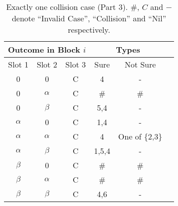 \documentclass[fleqn]{article}
\begin{document}
\begin {table} 
\centering
\begin{tabular}{|c|c|c|c|c|c|} 
\hline
\multicolumn{3}{|c|}{Outcome in Block $i$} & \multicolumn{2}{c|}{Types} \\ \hline
Slot 1        & Slot 2        & Slot 3     & Sure    & Not Sure         \\ \hline
0             & 0             & C          & 4       & -                \\ \hline
0             & $\alpha$      & C          & \#      & \#               \\ \hline
0             & $\beta$       & C          & 5,4     & -                \\ \hline
$\alpha$      & 0             & C          & 1,4     & -                \\ \hline
$\alpha$      & $\alpha$      & C          & 4       & One of \{2,3\}   \\ \hline
$\alpha$      & $\beta$       & C          & 1,5,4   & -                \\ \hline
$\beta$       & 0             & C          & \#      & \#               \\ \hline
$\beta$       & $\alpha$      & C          & \#      & \#               \\ \hline
$\beta$       & $\beta$       & C          & 4,6     & -                \\ \hline

\end{tabular}
\caption{Exactly one collision case (Part 3). \#, $C$ and $-$ denote ``Invalid Case'', ``Collision'' and  ``Nil'' respectively.}
\label{Tab_OneC3}
\end{table}
\end{document}
